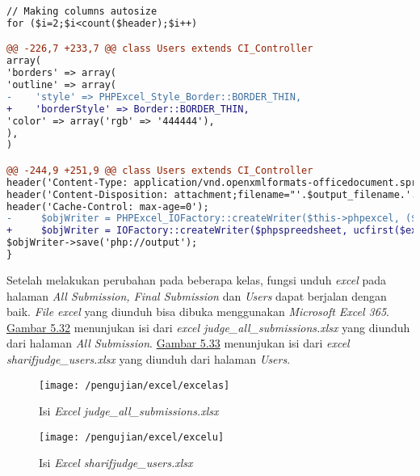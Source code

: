 \begin{lstlisting}[language=diff, basicstyle=\ttfamily, frame=single,
columns=fullflexible, keepspaces=true, breaklines=true]
// Making columns autosize
for ($i=2;$i<count($header);$i++)

@@ -226,7 +233,7 @@ class Users extends CI_Controller
array(
'borders' => array(
'outline' => array(
-    'style' => PHPExcel_Style_Border::BORDER_THIN,
+    'borderStyle' => Border::BORDER_THIN,
'color' => array('rgb' => '444444'),
),
)

@@ -244,9 +251,9 @@ class Users extends CI_Controller
header('Content-Type: application/vnd.openxmlformats-officedocument.spreadsheetml.sheet');
header('Content-Disposition: attachment;filename="'.$output_filename.'.'.$ext.'"');
header('Cache-Control: max-age=0');
-     $objWriter = PHPExcel_IOFactory::createWriter($this->phpexcel, ($ext==='xlsx'?'Excel2007':'Excel5'));
+     $objWriter = IOFactory::createWriter($phpspreedsheet, ucfirst($ext));
$objWriter->save('php://output');
}
\end{lstlisting}

	Setelah melakukan perubahan pada beberapa kelas, fungsi unduh \textit{excel} pada halaman \textit{All Submission, Final Submission} dan \textit{Users} dapat berjalan dengan baik. \textit{File excel} yang diunduh bisa dibuka menggunakan \textit{Microsoft Excel 365}. \hyperref[fig:excelas]{Gambar 5.32} menunjukan isi dari \textit{excel judge\_all\_submissions.xlsx} yang diunduh dari halaman \textit{All Submission}. \hyperref[fig:excelu]{Gambar 5.33} menunjukan isi dari \textit{excel sharifjudge\_users.xlsx} yang diunduh dari halaman \textit{Users}.
	\begin{figure}[H]
		\centering  
		\texttt{[image: /pengujian/excel/excelas]}  
		\caption[Isi \textit{Excel judge\_all\_submissions.xlsx}]{Isi \textit{Excel judge\_all\_submissions.xlsx}} 
		\label{fig:excelas} 
	\end{figure}
	
	\begin{figure}[H]
		\centering  
		\texttt{[image: /pengujian/excel/excelu]}  
		\caption[Isi \textit{Excel sharifjudge\_users.xlsx}]{Isi \textit{Excel sharifjudge\_users.xlsx}} 
		\label{fig:excelu} 
	\end{figure}

